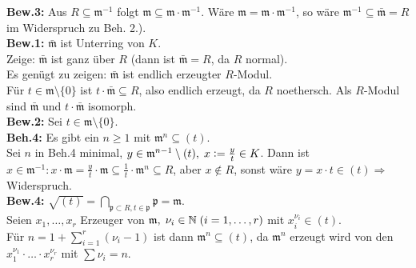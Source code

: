 \documentclass[a4paper, 10pt]{report}
\begin{document}
\begin{Bew}
\textbf{Bew.3:} Aus $R \subseteq \mathfrak{m}^{-1}$ folgt $\mathfrak{m}
\subseteq \mathfrak{m} \cdot \mathfrak{m}^{-1}$. Wäre $\mathfrak{m} =
\mathfrak{m} \cdot \mathfrak{m}^{-1}$, so wäre $\mathfrak{m}^{-1} \subseteq
\bar{\mathfrak{m}} = R$ im Widerspruch zu Beh. 2.).\\
\textbf{Bew.1:} $\bar{\mathfrak{m}}$ ist Unterring von $K$.\\
Zeige: $\bar{\mathfrak{m}}$ ist ganz über $R$ (dann ist $\bar{\mathfrak{m}} =
R$, da $R$ normal).\\
Es genügt zu zeigen: $\bar{\mathfrak{m}}$ ist endlich erzeugter $R$-Modul.\\
Für $t \in \mathfrak{m} \setminus \{0\}$ ist $t \cdot \bar{\mathfrak{m}}
\subseteq R$, also endlich erzeugt, da $R$ noethersch.
Als $R$-Modul sind $\bar{\mathfrak{m}}$ und $t \cdot \bar{\mathfrak{m}}$
isomorph.\\
\textbf{Bew.2:} Sei $t \in \mathfrak{m} \setminus\{0\}$.\\
\textbf{Beh.4:} Es gibt ein $n \geq 1$ mit $\mathfrak{m}^n \subseteq (t)$.\\
Sei $n$ in Beh.4 minimal, $y \in \mathfrak{m}^{n-1} \setminus (t), \; x \mathrel{\mathop:}=
\frac{y}{t} \in K$.
Dann ist $x \in \mathfrak{m}^{-1}: x \cdot \mathfrak{m} = \frac{y}{t} \cdot
\mathfrak{m} \subseteq \frac{1}{t} \cdot \mathfrak{m}^n \subseteq R$, aber $x
\not\in R$, sonst wäre $y = x \cdot t \in (t) \Rightarrow$ Widerspruch.\\
\textbf{Bew.4:} $\sqrt{(t)} = \bigcap_{\mathfrak{p} \subset R, t \in
\mathfrak{p}} \mathfrak{p} = \mathfrak{m}$.\\
Seien $x_1, \dots, x_r$ Erzeuger von $\mathfrak{m}, \; \nu_i \in \mathbb{N}
\;(i=1, \dots,r)$ mit $x_i^{\nu_i} \in (t)$.\\
Für $n = 1 + \sum_{i =1}^r(\nu_i -1)$ ist dann $\mathfrak{m}^n \subseteq (t)$,
da $\mathfrak{m}^n$ erzeugt wird von den $x_1^{\nu_1} \cdot \ldots \cdot
x_r^{\nu_r}$ mit $\sum \nu_i = n$.
\end{Bew}
\end{document}
